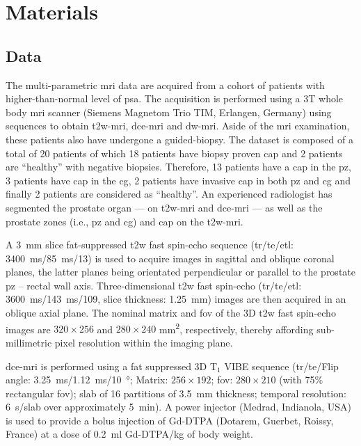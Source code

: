 \section{Materials}\label{sec:materials}

\subsection{Data}\label{sec:data}

The multi-parametric \ac{mri} data are acquired from a cohort of patients with higher-than-normal level of \ac{psa}.
The acquisition is performed using a 3T whole body \ac{mri} scanner (Siemens Magnetom Trio TIM, Erlangen, Germany) using sequences to obtain \ac{t2w}-\ac{mri}, \ac{dce}-\ac{mri} and \ac{dw}-\ac{mri}.
Aside of the \ac{mri} examination, these patients also have undergone a guided-biopsy.
The dataset is composed of a total of 20 patients of which 18 patients have biopsy proven \ac{cap} and 2 patients are ``healthy'' with negative biopsies.
Therefore, 13 patients have a \ac{cap} in the \ac{pz}, 3 patients have \ac{cap} in the \ac{cg}, 2 patients have invasive \ac{cap} in both \ac{pz} and \ac{cg} and finally 2 patients are considered as ``healthy''.
An experienced radiologist has segmented the prostate organ --- on \ac{t2w}-\ac{mri} and \ac{dce}-\ac{mri} --- as well as the prostate zones (i.e., \ac{pz} and \ac{cg}) and \ac{cap} on the \ac{t2w}-\ac{mri}.

A \SI{3}{\mm} slice fat-suppressed \ac{t2w} fast spin-echo sequence (\ac{tr}/\ac{te}/\ac{etl}: \SI{3400}{\ms}/\SI{85}{\ms}/13) is used to acquire images in sagittal and oblique coronal planes, the latter planes being orientated perpendicular or parallel to the prostate \ac{pz} – rectal wall axis.
Three-dimensional \ac{t2w} fast spin-echo (\ac{tr}/\ac{te}/\ac{etl}: \SI{3600}{\ms}/\SI{143}{\ms}/109, slice thickness: \SI{1.25}{\mm}) images are then acquired in an oblique axial plane.
The nominal matrix and \ac{fov} of the 3D \ac{t2w} fast spin-echo images are $320 \times 256$ and $280 \times 240$ mm\textsuperscript{2}, respectively, thereby affording sub-millimetric pixel resolution within the imaging plane.

\ac{dce}-\ac{mri} is performed using a fat suppressed 3D T$_1$ VIBE sequence (\ac{tr}/\ac{te}/Flip angle: \SI{3.25}{\ms}/\SI{1.12}{\ms}/\SI{10}{\degree}; Matrix: $256 \times 192$; \ac{fov}: $280 \times 210$ (with 75\% rectangular \ac{fov}); slab of 16 partitions of \SI{3.5}{\mm} thickness; temporal resolution: \SI{6}{\s}/slab over approximately \SI{5}{\minute}).
A power injector (Medrad, Indianola, USA) is used to provide a bolus injection of Gd-DTPA (Dotarem, Guerbet, Roissy, France) at a dose of \SI{0.2}{\ml} Gd-DTPA/kg of body weight.

